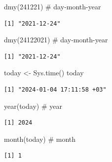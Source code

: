 \documentclass[
  letterpaper,
  DIV=11,
  numbers=noendperiod]{scrreprt}
\newenvironment{Shaded}{\begin{snugshade}}{\end{snugshade}}
\newcommand{\CommentTok}[1]{\textcolor[rgb]{0.37,0.37,0.37}{#1}}
\newcommand{\DecValTok}[1]{\textcolor[rgb]{0.68,0.00,0.00}{#1}}
\newcommand{\FunctionTok}[1]{\textcolor[rgb]{0.28,0.35,0.67}{#1}}
\newcommand{\NormalTok}[1]{\textcolor[rgb]{0.00,0.23,0.31}{#1}}
\newcommand{\OtherTok}[1]{\textcolor[rgb]{0.00,0.23,0.31}{#1}}
\begin{document}
\begin{Shaded}
\begin{Highlighting}[]
\FunctionTok{dmy}\NormalTok{(}\DecValTok{241221}\NormalTok{) }\CommentTok{\# day{-}month{-}year}
\end{Highlighting}
\end{Shaded}

\begin{verbatim}
[1] "2021-12-24"
\end{verbatim}

\begin{Shaded}
\begin{Highlighting}[]
\FunctionTok{dmy}\NormalTok{(}\DecValTok{24122021}\NormalTok{) }\CommentTok{\# day{-}month{-}year}
\end{Highlighting}
\end{Shaded}

\begin{verbatim}
[1] "2021-12-24"
\end{verbatim}

\begin{Shaded}
\begin{Highlighting}[]
\NormalTok{today }\OtherTok{\textless{}{-}} \FunctionTok{Sys.time}\NormalTok{()}
\NormalTok{today}
\end{Highlighting}
\end{Shaded}

\begin{verbatim}
[1] "2024-01-04 17:11:58 +03"
\end{verbatim}

\begin{Shaded}
\begin{Highlighting}[]
\FunctionTok{year}\NormalTok{(today) }\CommentTok{\# year}
\end{Highlighting}
\end{Shaded}

\begin{verbatim}
[1] 2024
\end{verbatim}

\begin{Shaded}
\begin{Highlighting}[]
\FunctionTok{month}\NormalTok{(today) }\CommentTok{\# month}
\end{Highlighting}
\end{Shaded}

\begin{verbatim}
[1] 1
\end{verbatim}
\end{document}
